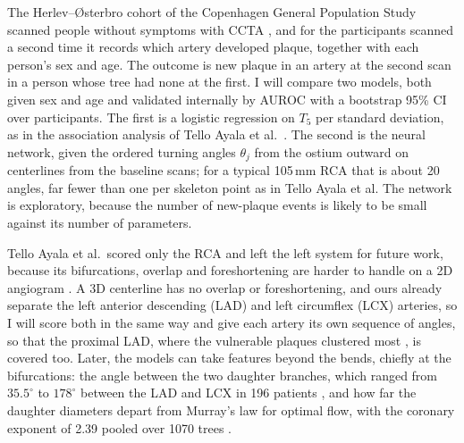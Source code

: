 The Herlev--{\O}sterbro cohort of the Copenhagen General Population Study scanned people without
symptoms with CCTA \cite{fuchs2023cgps}, and for the participants scanned a second time it records
which artery developed plaque, together with each person's sex and age.
The outcome is new plaque in an artery at the second scan in a person whose tree had none at the first.
I will compare two models, both given sex and age and validated internally by AUROC with a
bootstrap 95\% CI over participants.
The first is a logistic regression on $T_5$ per standard deviation, as in the association analysis
of Tello Ayala et al.\ \cite{telloayala2026tortuosity}.
The second is the neural network, given the ordered turning angles $\theta_j$ from the ostium
outward on centerlines from the baseline scans; for a typical 105\,mm RCA that is about 20 angles,
far fewer than one per skeleton point as in Tello Ayala et al.
The network is exploratory, because the number of new-plaque events is likely to be small against
its number of parameters.

Tello Ayala et al.\ scored only the RCA and left the left system for future work, because its
bifurcations, overlap and foreshortening are harder to handle on a 2D angiogram
\cite{telloayala2026tortuosity}.
A 3D centerline has no overlap or foreshortening, and ours already separate the left anterior descending
(LAD) and left circumflex (LCX) arteries, so I will score both in the same way and give each artery
its own sequence of angles, so that the proximal LAD, where the vulnerable plaques clustered most
\cite{araki2020plaques}, is covered too.
Later, the models can take features beyond the bends, chiefly at the bifurcations: the angle
between the two daughter branches, which ranged from $35.5^\circ$ to $178^\circ$ between the LAD and
LCX in 196 patients \cite{temov2016bifurcation}, and how far the daughter diameters depart from
Murray's law for optimal flow, with the coronary exponent of 2.39 pooled over 1070 trees
\cite{taylor2024murray}.
